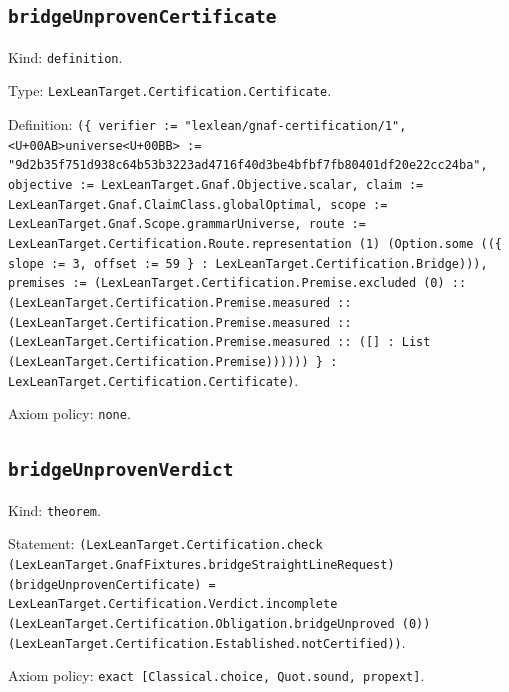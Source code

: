 \documentclass[11pt]{article}
\begin{document}
\subsection*{\texttt{bridgeUnprovenCertificate}}
\noindent Kind: \texttt{definition}.\par
\noindent Type: \texttt{LexLeanTarget.Certification.Certificate}.\par
\noindent Definition: \texttt{(\{ verifier := "lexlean/gnaf-certification/1", <U+00AB>universe<U+00BB> := "9d2b35f751d938c64b53b3223ad4716f40d3be4bfbf7fb80401df20e22cc24ba", objective := LexLeanTarget.Gnaf.Objective.scalar, claim := LexLeanTarget.Gnaf.ClaimClass.globalOptimal, scope := LexLeanTarget.Gnaf.Scope.grammarUniverse, route := LexLeanTarget.Certification.Route.representation (1) (Option.some ((\{ slope := 3, offset := 59 \} : LexLeanTarget.Certification.Bridge))), premises := (LexLeanTarget.Certification.Premise.excluded (0) :: (LexLeanTarget.Certification.Premise.measured :: (LexLeanTarget.Certification.Premise.measured :: (LexLeanTarget.Certification.Premise.measured :: ([] : List (LexLeanTarget.Certification.Premise)))))) \} : LexLeanTarget.Certification.Certificate)}.\par
\noindent Axiom policy: \texttt{none}.\par
\subsection*{\texttt{bridgeUnprovenVerdict}}
\noindent Kind: \texttt{theorem}.\par
\noindent Statement: \texttt{(LexLeanTarget.Certification.check (LexLeanTarget.GnafFixtures.bridgeStraightLineRequest) (bridgeUnprovenCertificate) = LexLeanTarget.Certification.Verdict.incomplete (LexLeanTarget.Certification.Obligation.bridgeUnproved (0)) (LexLeanTarget.Certification.Established.notCertified))}.\par
\noindent Axiom policy: \texttt{exact [Classical.choice, Quot.sound, propext]}.\par
\end{document}
